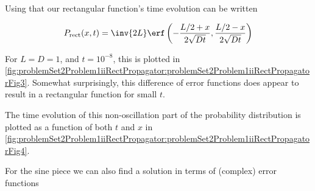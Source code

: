 {Using that our rectangular function's time evolution can be written

\begin{dmath}\label{eqn:basicStatMechProblemSet2Problem1:500}
P_{\mathrm{rect}}(x, t)
=
\inv{2 L} \erf
\left(
-\frac{L/2 +x}{2 \sqrt{D t}}
,
\frac{L/2 -x}{2 \sqrt{D t}}
\right)
\end{dmath}

For $L = D = 1$, and $t = 10^{-8}$, this is plotted in \cref{fig:problemSet2Problem1iiRectPropagator:problemSet2Problem1iiRectPropagatorFig3}.  Somewhat surprisingly, this difference of error functions does appear to result in a rectangular function for small $t$.


The time evolution of this non-oscillation part of the probability distribution is plotted as a function of both $t$ and $x$ in \cref{fig:problemSet2Problem1iiRectPropagator:problemSet2Problem1iiRectPropagatorFig4}.


For the sine piece we can also find a solution in terms of (complex) error functions

}
